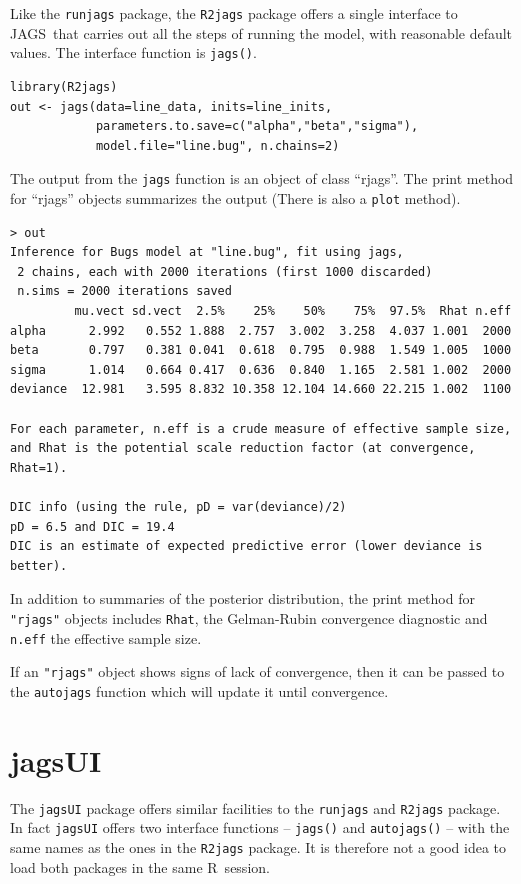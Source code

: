 \documentclass[11pt, a4paper, titlepage]{report}
\newcommand{\JAGS}{\textsf{JAGS}}
\newcommand{\R}{\textsf{R}}
\begin{document}
Like the \texttt{runjags} package, the \texttt{R2jags} package offers
a single interface to \JAGS\ that carries out all the steps of running
the model, with reasonable default values. The interface function is
\texttt{jags()}.
\begin{verbatim}
library(R2jags)
out <- jags(data=line_data, inits=line_inits,
            parameters.to.save=c("alpha","beta","sigma"),
            model.file="line.bug", n.chains=2)
\end{verbatim}
The output from the \texttt{jags} function is an object of class ``rjags''.
The print method for ``rjags'' objects summarizes the output (There is
also a \texttt{plot} method).
\begin{verbatim}
> out
Inference for Bugs model at "line.bug", fit using jags,
 2 chains, each with 2000 iterations (first 1000 discarded)
 n.sims = 2000 iterations saved
         mu.vect sd.vect  2.5%    25%    50%    75%  97.5%  Rhat n.eff
alpha      2.992   0.552 1.888  2.757  3.002  3.258  4.037 1.001  2000
beta       0.797   0.381 0.041  0.618  0.795  0.988  1.549 1.005  1000
sigma      1.014   0.664 0.417  0.636  0.840  1.165  2.581 1.002  2000
deviance  12.981   3.595 8.832 10.358 12.104 14.660 22.215 1.002  1100

For each parameter, n.eff is a crude measure of effective sample size,
and Rhat is the potential scale reduction factor (at convergence, Rhat=1).

DIC info (using the rule, pD = var(deviance)/2)
pD = 6.5 and DIC = 19.4
DIC is an estimate of expected predictive error (lower deviance is better).
\end{verbatim}
In addition to summaries of the posterior distribution, the print
method for \texttt{"rjags"} objects includes \texttt{Rhat}, the
Gelman-Rubin convergence diagnostic \citep{GelmanRubin1992} and
\texttt{n.eff} the effective sample size.

If an \texttt{"rjags"} object shows signs of lack of convergence,
then it can be passed to the \texttt{autojags} function which will
update it until convergence.

\section{jagsUI}
\label{section:R:jagsUI}

The \texttt{jagsUI} package offers similar facilities to the
\texttt{runjags} and \texttt{R2jags} package. In fact \texttt{jagsUI}
offers two interface functions -- \texttt{jags()} and
\texttt{autojags()} -- with the same names as the ones in the
\texttt{R2jags} package. It is therefore not a good idea to load both
packages in the same \R\ session.
\end{document}
